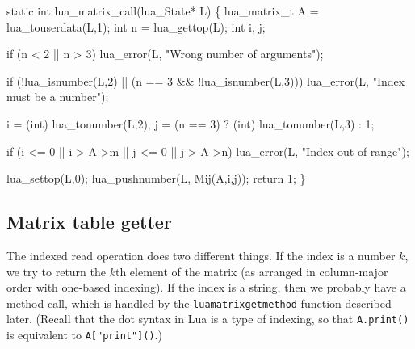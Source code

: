 \nwenddocs{}\endmoddef
static int lua_matrix_call(lua_State* L)
\{
    lua_matrix_t A = lua_touserdata(L,1);
    int n = lua_gettop(L);
    int i, j;

    if (n < 2 || n > 3)
        lua_error(L, "Wrong number of arguments");

    if (!lua_isnumber(L,2) || (n == 3 && !lua_isnumber(L,3)))
        lua_error(L, "Index must be a number");

    i = (int) lua_tonumber(L,2);
    j = (n == 3) ? (int) lua_tonumber(L,3) : 1;

    if (i <= 0 || i > A->m || j <= 0 || j > A->n)
        lua_error(L, "Index out of range");

    lua_settop(L,0);
    lua_pushnumber(L, Mij(A,i,j));
    return 1;
\}

\nwendcode{}\nwdocspar


\subsection{Matrix table getter}

The indexed read operation does two different things.  If the index
is a number $k$, we try to return the $k$th element of the matrix
(as arranged in column-major order with one-based indexing).
If the index is a string, then we probably have a method call,
which is handled by the {\tt{}lua{}matrix{}getmethod} function described
later.  (Recall that the dot syntax in Lua is a type of indexing,
so that {\tt{}A.print()} is equivalent to {\tt{}A["print"]()}.)

